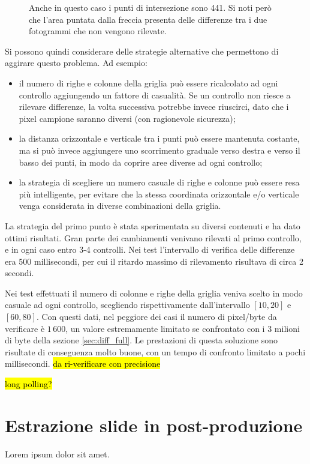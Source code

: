 \begin{figure}[htbp]
\begin{subfigure}[t]{0.5\textwidth}
	\end{subfigure}
	
	\caption{Anche in questo caso i punti di intersezione sono 441. Si noti però che l'area puntata dalla freccia presenta delle differenze tra i due fotogrammi che non vengono rilevate.}
	\label{fig:diff_slide2}
\end{figure}

Si possono quindi considerare delle strategie alternative che permettono di aggirare questo problema. Ad esempio:

\begin{itemize}
	\item il numero di righe e colonne della griglia può essere ricalcolato ad ogni controllo aggiungendo un fattore di casualità. Se un controllo non riesce a rilevare differenze, la volta successiva potrebbe invece riuscirci, dato che i pixel campione saranno diversi (con ragionevole sicurezza);
	\item la distanza orizzontale e verticale tra i punti può essere mantenuta costante, ma si può invece aggiungere uno scorrimento graduale verso destra e verso il basso dei punti, in modo da coprire aree diverse ad ogni controllo;
	\item la strategia di scegliere un numero casuale di righe e colonne può essere resa più intelligente, per evitare che la stessa coordinata orizzontale e/o verticale venga considerata in diverse combinazioni della griglia.
\end{itemize}

La strategia del primo punto è stata sperimentata su diversi contenuti e ha dato ottimi risultati. Gran parte dei cambiamenti venivano rilevati al primo controllo, e in ogni caso entro 3-4 controlli. Nei test l'intervallo di verifica delle differenze era 500 millisecondi, per cui il ritardo massimo di rilevamento risultava di circa 2 secondi.

Nei test effettuati il numero di colonne e righe della griglia veniva scelto in modo casuale ad ogni controllo, scegliendo rispettivamente dall'intervallo $[10, 20]$ e $[60, 80]$. Con questi dati, nel peggiore dei casi il numero di pixel/byte da verificare è $1\,600$, un valore estremamente limitato se confrontato con i 3 milioni di byte della sezione \ref{sec:diff_full}. Le prestazioni di questa soluzione sono risultate di conseguenza molto buone, con un tempo di confronto limitato a pochi millisecondi. \hl{da ri-verificare con precisione}

\hl{long polling?}

\section{Estrazione slide in post-produzione}
\label{sec:diff_postprod}

Lorem ipsum dolor sit amet.

